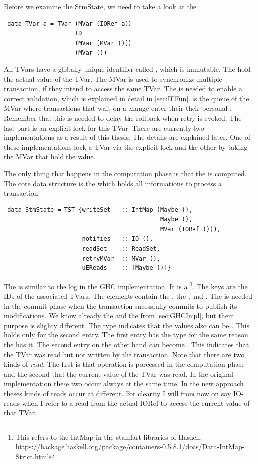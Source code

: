Before we examine the StmState, we need to take a look at the 
\begin{lstlisting}
 data TVar a = TVar (MVar (IORef a))
                    ID
                    (MVar [MVar ()])
                    (MVar ())
\end{lstlisting}
All TVars have a globally unique identifier called , which is immutable. The  
hold the actual value of the TVar. The MVar is used to synchronize multiple transaction, if they intend to 
access the same TVar. The  is needed to enable a correct validation, which is explained in detail
in \ref{sec:IFFun}.  is the queue of the MVar where transactions that wait on a change
enter their their personal . Remember that this is needed to delay the rollback when retry
is evoked. The last part is an explicit lock for this TVar. There are currently two implementations as 
a result of this thesis. The details are explained later. One of these implementations lock a TVar via 
the explicit lock and the other by taking the MVar that hold the value.

The only thing that happens in the computation phase is that the  is computed.
The core data structure is the  which holds all informations to process a transaction:
\begin{lstlisting}
 data StmState = TST {writeSet   :: IntMap (Maybe (),
                                            Maybe (),
                                            MVar (IORef ())),
                      notifies   :: IO (),
                      readSet    :: ReadSet,
                      retryMVar  :: MVar (),
                      uEReads    :: [Maybe ()]}
\end{lstlisting}
The  is similar to the log in the GHC implementation. It is a  
\footnote{This refers to the IntMap in the standart libraries of Haskell: \url{https://hackage.haskell.org/package/containers-0.5.8.1/docs/Data-IntMap-Strict.html}}. 
The keys are the IDs of the associated TVars. The elements contain the ,
the , and . The  is needed in the commit
phase when the transaction sucessfully commits to publish its modifications. We know already the 
 and the  from \ref{sec:GHCImpl}, but their purpose is slighty 
different. The  type indicates that the values also can be . This holds
only for the second entry. The first entry has the  type for the same reason the 
 has it. The second entry on the other hand can become . This indicates
that the TVar was read but not written by the transaction. Note that there are two kinds of 
\textit{read}. The first is that  operation is porcessed in the computation phase
and the second that the current value of the TVar was read. In the original implementation these 
two occur always at the same time. In the new approach theses kinds of reads occur at different.
For clearity I will from now on say IO-reads when I refer to a read from the actual IORef to access
the current value of that TVar. 

